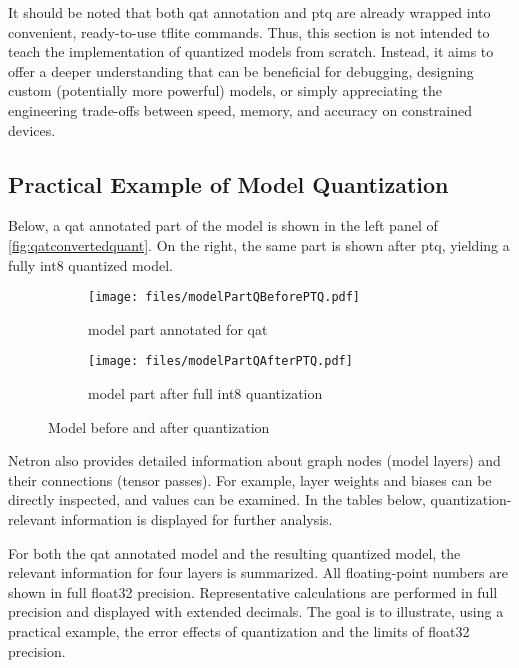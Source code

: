 {It should be noted that both \gls{qat} annotation and \gls{ptq} are already wrapped into convenient, ready-to-use \gls{tflite} commands.
Thus, this section is not intended to teach the implementation of quantized models from scratch. Instead, it aims to offer a deeper understanding that can be beneficial for debugging, designing custom (potentially more powerful) models, or simply appreciating the engineering trade-offs between speed, memory, and accuracy on constrained devices.

\subsection{Practical Example of Model Quantization}
\label{subsubsec:optquant}

Below, a \gls{qat} annotated part of the model is shown in the left panel of \autoref{fig:qatconvertedquant}.
On the right, the same part is shown after \gls{ptq}, yielding a fully \gls{int8} quantized model.

\begin{figure}[H]
  \centering
  \begin{subfigure}[t]{0.48\textwidth}
    \centering
    \texttt{[image: files/modelPartQBeforePTQ.pdf]}
    \caption{model part annotated for \protect\gls{qat}}
  \end{subfigure}
  \hfill
  \begin{subfigure}[t]{0.48\textwidth}
    \centering
    \texttt{[image: files/modelPartQAfterPTQ.pdf]}
    \caption{model part after full \protect\gls{int8} quantization}
  \end{subfigure}
  \caption{Model before and after quantization}
  \label{fig:qatconvertedquant}
\end{figure}

Netron also provides detailed information about graph nodes (model layers) and their connections (tensor passes).
For example, layer weights and biases can be directly inspected, and values can be examined.
In the tables below, quantization-relevant information is displayed for further analysis.

For both the \gls{qat} annotated model and the resulting quantized model, the relevant information for four layers is summarized.
All floating-point numbers are shown in full \gls{float32} precision.
Representative calculations are performed in full precision and displayed with extended decimals.
The goal is to illustrate, using a practical example, the error effects of quantization and the limits of \gls{float32} precision.

}
